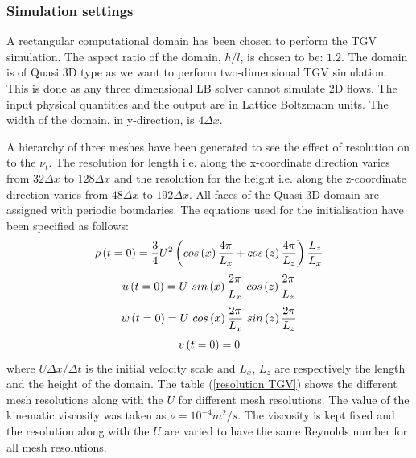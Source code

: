 \subsubsection{Simulation settings}

A rectangular computational domain has been chosen to perform the TGV simulation. The aspect ratio of the domain, $h/l$, is chosen to be: $1.2$. The domain is of Quasi 3D type as we want to perform two-dimensional TGV simulation. This is done as any three dimensional LB solver cannot simulate 2D flows. The input physical quantities and the output are in Lattice Boltzmann units. The width of the domain, in y-direction, is $4\Delta x$. 

A hierarchy of three meshes have been generated to see the effect of resolution on to the $\nu_t$. The resolution for length i.e. along the x-coordinate direction varies from $32\Delta x$ to $128\Delta x$ and the resolution for the height i.e. along the z-coordinate direction varies from $48\Delta x$ to $192\Delta x$. All faces of the Quasi 3D domain are assigned with periodic boundaries.
The equations used for the initialisation have been specified as follows:
%
\begin{equation}
\label{TGV den}
\rho\left(t=0\right) = \frac{3}{4} U^2 \left(cos\left(x\right)\frac{4\pi}{L_x} + cos\left(z\right)\frac{4\pi}{L_z}\right)\frac{L_z}{L_x}\\
\end{equation}
%
%
\begin{equation}
\label{TGV u}
u\left(t=0\right) = U\ sin\left(x\right)\frac{2\pi}{L_x}\ cos\left(z\right)\frac{2\pi}{L_z}\\
\end{equation}
%
%
\begin{equation}
\label{TGV w}
w\left(t=0\right) = U\ cos\left(x\right)\frac{2\pi}{L_x}\ sin\left(z\right)\frac{2\pi}{L_z}\\
\end{equation}
%
%
\begin{equation}
\label{TGV v}
v\left(t=0\right) = 0\\
\end{equation}
%
where $U \Delta x / \Delta t$ is the initial velocity scale and $L_x$, $L_z$ are respectively the length and the height of the domain. The table (\ref{resolution TGV}) shows the different mesh resolutions along with the $U$ for different mesh resolutions. The value of the kinematic viscosity was taken as $\nu = 10^{-4} m^2/s$. The viscosity is kept fixed and the resolution along with the $U$ are varied to have the same Reynolds number for all mesh resolutions. 
